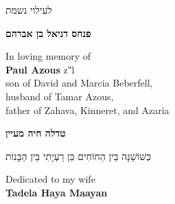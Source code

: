 \begin{center}
\end{center}
\clearpage

\thispagestyle{empty}
\vspace*{\fill}
\begin{center}
  {\small לעילוי נשמת\par}
  \smallskip
  {\large\bfseries פנחס דניאל בן אברהם\par}
  \bigskip
  \begin{otherlanguage}{english}\small
    In loving memory of\\[2pt]
    {\normalsize\bfseries Paul Azous} z″l\\[4pt]
    son of David and Marcia Beberfell,\\
    husband of Tamar Azous,\\
    father of Zahava, Kinneret, and Azaria\par
  \end{otherlanguage}
\end{center}
\vspace*{\fill}\vspace*{\fill}
\clearpage

\thispagestyle{empty}
\vspace*{\fill}
\begin{center}
  {\large\bfseries טדלה חיה מעיין\par}
  \medskip
  {\small כְּשׁוֹשַׁנָּה בֵּין הַחוֹחִים כֵּן רַעְיָתִי בֵּין הַבָּנוֹת\par}
  \bigskip
  \begin{otherlanguage}{english}\small
    Dedicated to my wife\\[4pt]
    {\normalsize\bfseries Tadela Haya Maayan}\par
  \end{otherlanguage}
\end{center}
\vspace*{\fill}\vspace*{\fill}
\clearpage

